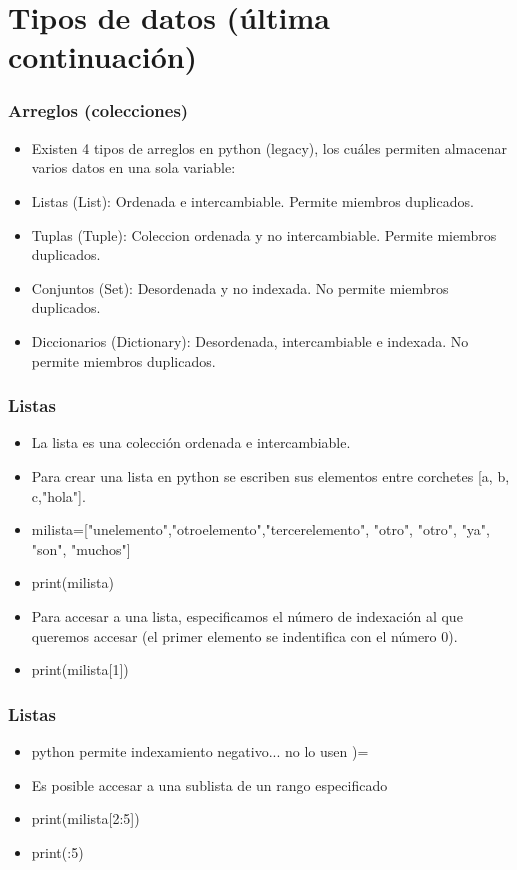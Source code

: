 \documentclass[hyperref={pdfpagelabels=false},xcolor=pst,pdf,fragile]{beamer}
\begin{document}
\section{Tipos de datos (última continuación)}
\begin{frame}
    \frametitle{Arreglos (colecciones)}
    \pause
    \begin{itemize}
    \item Existen 4 tipos de arreglos en python (legacy), los cuáles permiten almacenar varios datos en una sola variable:
    \item Listas (List): Ordenada e intercambiable. Permite miembros duplicados.
    \item Tuplas (Tuple): Coleccion ordenada y no intercambiable. Permite miembros duplicados.
    \item Conjuntos (Set): Desordenada y no indexada. No permite miembros duplicados.
    \item Diccionarios (Dictionary): Desordenada, intercambiable e indexada. No permite miembros duplicados.
    \end{itemize}
\end{frame}

\begin{frame}
    \frametitle{Listas}
    \pause
    \begin{itemize}
    \item La lista es una colección ordenada e intercambiable.
    \item Para crear una lista en python se escriben sus elementos entre corchetes [a, b, c,"hola"].
    \item mi\textunderscore lista=["un\textunderscore elemento","otro\textunderscore elemento","tercer\textunderscore elemento", "otro", "otro", "ya", "son", "muchos"]
    \item print(mi\textunderscore lista)
    \item Para accesar a una lista, especificamos el número de indexación al que queremos accesar (el primer elemento se indentifica con el número 0).
    \item print(mi\textunderscore lista[1])
    \end{itemize}
\end{frame}

\begin{frame}
    \frametitle{Listas}
    \pause
    \begin{itemize}
    \item python permite indexamiento negativo... \pause no lo usen )=
    \item Es posible accesar a una sublista de un rango especificado
    \item print(mi\textunderscore lista[2:5])
    \item print(:5)
    \end{itemize}
\end{frame}
\end{document}
